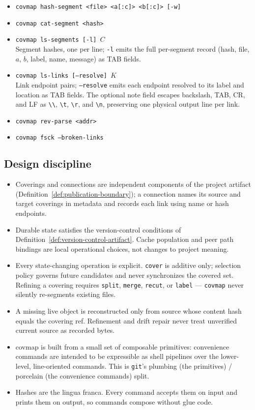 \documentclass[11pt,a4paper]{article}
\begin{document}
\begin{itemize}[leftmargin=2em,itemsep=2pt]
\item \texttt{covmap hash-segment <file> <a[:c]> <b[:c]> [-w]}
\item \texttt{covmap cat-segment <hash>}
\item \texttt{covmap ls-segments [-l] $C$}\\
      Segment hashes, one per line; \texttt{-l} emits the full per-segment
      record (hash, file, $a$, $b$, label, name, message) as TAB fields.
\item \texttt{covmap ls-links [--resolve] $K$}\\
      Link endpoint pairs; \texttt{--resolve} emits each endpoint resolved
      to its label and location as TAB fields. The optional note field escapes
      backslash, TAB, CR, and LF as \texttt{\textbackslash\textbackslash},
      \texttt{\textbackslash t}, \texttt{\textbackslash r}, and
      \texttt{\textbackslash n}, preserving one physical output line per link.
\item \texttt{covmap rev-parse <addr>}
\item \texttt{covmap fsck --broken-links}
\end{itemize}

\subsection{Design discipline}

\begin{itemize}[leftmargin=2em]
\item Coverings and connections are independent components of the project
      artifact (Definition~\ref{def:publication-boundary}); a
      connection names its source and target coverings in metadata and
      records each link using name or hash endpoints.
\item Durable state satisfies the version-control conditions of
      Definition~\ref{def:version-control-artifact}. Cache population and peer
      path bindings are local operational choices, not changes to project
      meaning.
\item Every state-changing operation is explicit. \texttt{cover} is
      additive only; selection policy governs future candidates and never
      synchronizes the covered set. Refining a covering requires \texttt{split},
      \texttt{merge}, \texttt{recut}, or \texttt{label} —
      \texttt{covmap} never silently re-segments existing files.
\item A missing live object is reconstructed only from source whose content
      hash equals the covering ref. Refinement and drift repair never treat
      unverified current source as recorded bytes.
\item covmap is built from a small set of composable primitives:
      convenience commands are intended to be expressible as shell
      pipelines over the lower-level, line-oriented commands. This is
      \texttt{git}'s plumbing (the primitives) / porcelain (the
      convenience commands) split.
\item Hashes are the lingua franca. Every command accepts them on
      input and prints them on output, so commands compose without
      glue code.
\end{itemize}
\end{document}
